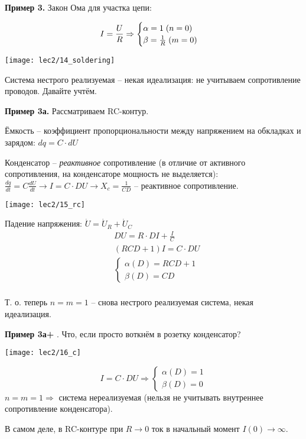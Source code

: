 \documentclass[main.tex]{subfiles}
\begin{document}
\textbf{Пример 3.} Закон Ома для участка цепи:

\[ I = \frac{U}{R} \Rightarrow \begin{cases}
    \alpha = 1 \thickspace (n = 0) \\
    \beta = \frac{1}{R} \thickspace (m=0)
\end{cases} \]

\texttt{[image: lec2/14\_soldering]}

Система нестрого реализуемая -- некая идеализация: не учитываем сопротивление проводов.
Давайте учтём.

\textbf{Пример 3а.} Рассматриваем RC-контур.

Ёмкость -- коэффициент пропорциональности между напряжением на обкладках и зарядом: $ dq = C \cdot dU $

Конденсатор -- \emph{реактивное} сопротивление (в отличие от активного сопротивления, на конденсаторе мощность не выделяется): $ \frac{d q}{d t} = C \frac{d U}{d t} \to I = C \cdot DU \to X_c = \frac{1}{CD} $ -- реактивное сопротивление.

\texttt{[image: lec2/15\_rc]}

Падение напряжения: $ \dot U = \dot U_R + \dot U_C $
\begin{align*}
    & DU = R \cdot DI + \frac{I}{C} \\
    & (RCD + 1)I = C \cdot DU \\
    & \begin{cases}
        \alpha(D)  = RCD + 1 \\
        \beta(D) = CD
    \end{cases} \\
\end{align*}

Т. о. теперь $ n = m = 1 $ -- снова нестрого реализуемая система, некая идеализация.

\textbf{ Пример 3а+ }. Что, если просто воткнём в розетку конденсатор?

\texttt{[image: lec2/16\_c]}

\[ I = C \cdot DU \Rightarrow \begin{cases}
    \alpha(D) = 1 \\
    \beta(D) = 0
\end{cases} \]
$ n = m = 1 \Rightarrow $ система нереализуемая (нельзя не учитывать внутреннее сопротивление конденсатора).

В самом деле, в RC-контуре при $ R \to 0 $ ток в начальный момент $ I(0) \to \infty $.
\end{document}
